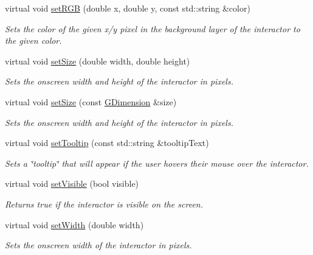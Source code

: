 \begin{DoxyCompactItemize}
virtual void \mbox{\hyperlink{classsgl_1_1GDrawingSurface_ae9a228792d4bb4b628350f39eaa3ad12}{set\+R\+GB}} (double x, double y, const std\+::string \&color)
\begin{DoxyCompactList}\small\item\em Sets the color of the given x/y pixel in the background layer of the interactor to the given color. \end{DoxyCompactList}\item 
virtual void \mbox{\hyperlink{classsgl_1_1GInteractor_aca25d49481f9bf5fc8f7df4c086c4ce7}{set\+Size}} (double width, double height)
\begin{DoxyCompactList}\small\item\em Sets the onscreen width and height of the interactor in pixels. \end{DoxyCompactList}\item 
virtual void \mbox{\hyperlink{classsgl_1_1GInteractor_ae2b628228f192c2702c4ce941b2af68f}{set\+Size}} (const \mbox{\hyperlink{structsgl_1_1GDimension}{G\+Dimension}} \&size)
\begin{DoxyCompactList}\small\item\em Sets the onscreen width and height of the interactor in pixels. \end{DoxyCompactList}\item 
virtual void \mbox{\hyperlink{classsgl_1_1GInteractor_a039e0e49beaecc275efce02d416acea8}{set\+Tooltip}} (const std\+::string \&tooltip\+Text)
\begin{DoxyCompactList}\small\item\em Sets a \char`\"{}tooltip\char`\"{} that will appear if the user hovers their mouse over the interactor. \end{DoxyCompactList}\item 
virtual void \mbox{\hyperlink{classsgl_1_1GInteractor_a18e44e30b31525a243960ca3928125aa}{set\+Visible}} (bool visible)
\begin{DoxyCompactList}\small\item\em Returns true if the interactor is visible on the screen. \end{DoxyCompactList}\item 
virtual void \mbox{\hyperlink{classsgl_1_1GInteractor_aa3f3fba4cb131baa8696ba01e3bceca1}{set\+Width}} (double width)
\begin{DoxyCompactList}\small\item\em Sets the onscreen width of the interactor in pixels. \end{DoxyCompactList}\item 

\end{DoxyCompactItemize}
